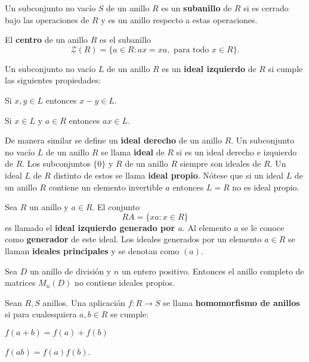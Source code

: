 \begin{definicion}
Un subconjunto no vacío $S$ de un anillo $R$ es un \textbf{subanillo} de $R$ si es cerrado bajo las operaciones de $R$ y es un anillo respecto a estas operaciones.
\end{definicion}
\begin{definicion}
El \textbf{centro} de un anillo $R$ es el subanillo \[ \mathcal{Z}(R) = \{a \in R \colon ax = xa, \mbox{ para todo } x \in R \}. \]
\end{definicion}
\begin{definicion}
Un subconjunto no vacío $L$ de un anillo $R$ es un \textbf{ideal izquierdo} de $R$ si cumple las siguientes propiedades:
\begin{bulletList}
\item Si $x,y \in L$ entonces $x-y \in L$.
\item Si $x \in L$ y $a \in R$ entonces $ax \in L$.
\end{bulletList}
\end{definicion}
De manera similar se define un \textbf{ideal derecho} de un anillo $R$. Un subconjunto no vacío $L$ de un anillo $R$ se llama \textbf{ideal} de $R$ si es un ideal derecho e izquierdo de $R$. 
Los subconjuntos $\{0\}$ y $R$ de un anillo $R$ siempre son ideales de $R$. Un ideal $L$ de $R$ distinto de estos se llama \textbf{ideal propio}. Nótese que si un ideal $L$ de un anillo $R$ contiene un elemento invertible $a$ entonces $L=R$ no es ideal propio. 
\begin{definicion}
Sea $R$ un anillo y $a \in R$. El conjunto \[ RA = \{ xa \colon x \in R \} \] es llamado  el \textbf{ideal izquierdo generado por $a$}. Al elemento $a$ se le conoce como \textbf{generador} de este ideal. Los ideales generados por un elemento $a \in R$ se llaman \textbf{ideales principales} y se denotan como $(a)$.
\end{definicion}
\begin{proposicion}
Sea $D$ un anillo de división y $n$ un entero positivo. Entonces el anillo completo de matrices $M_n(D)$ no contiene ideales propios.
\end{proposicion}
\begin{definicion}
Sean $R, S$ anillos. Una aplicación $f \colon R \to S$ se llama \textbf{homomorfismo de anillos} si para cualesquiera $a,b \in R$ se cumple:
\begin{bulletList}
\item $f(a+b) = f(a) +f(b)$
\item $f(ab) = f(a)f(b)$.
\end{bulletList}
\end{definicion}
